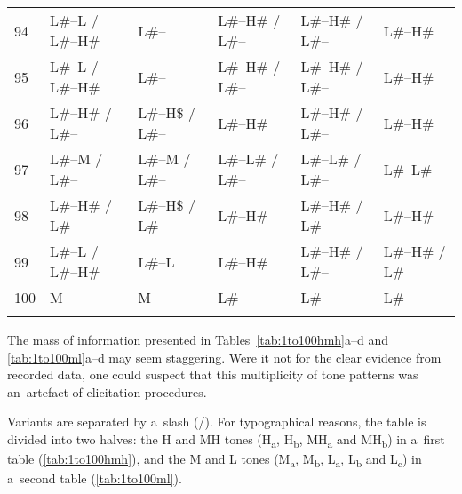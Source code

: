 {\begin{subtables}
\begin{table}[h!!]
{{\begin{tabularx}{\textwidth}{ l P{22mm} Q Q Q Q }
					94 & L\#--L / L\#--H\# & L\#-- & L\#--H\# / L\#-- & L\#--H\# / L\#-- & L\#--H\#\\
					95 & L\#--L / L\#--H\# & L\#-- & L\#--H\# / L\#-- & L\#--H\# / L\#-- & L\#--H\#\\
					96 & L\#--H\# / L\#-- & L\#--H\$ / L\#-- & L\#--H\# & L\#--H\# / L\#-- & L\#--H\#\\
					97 & L\#--M / L\#-- & L\#--M / L\#-- & L\#--L\# / L\#-- & L\#--L\# / L\#-- & L\#--L\#\\
					98 & L\#--H\# / L\#-- & L\#--H\$ / L\#-- & L\#--H\# & L\#--H\# / L\#-- & L\#--H\#\\
					99 & L\#--L / L\#--H\# & L\#--L & L\#--H\# & L\#--H\# / L\#-- & L\#--H\# / L\#\\
					100 & M & M & L\# & L\# & L\#\\
				\lspbottomrule
				\end{tabularx}}
			}
		\end{table}
	\end{subtables}
	\clearpage
}

   
The mass of information presented in Tables~\ref{tab:1to100hmh}a--d and \ref{tab:1to100ml}a--d may
seem staggering. Were it not for the clear evidence from recorded data, one could suspect that this
multiplicity of tone patterns was an~artefact of elicitation procedures.

{\largerpage}

Variants are separated by a~slash (/). For typographical reasons, the table is divided into two
halves: the H and MH tones (H\textsubscript{a}, H\textsubscript{b}, MH\textsubscript{a} and MH\textsubscript{b}) in a~first table (\ref{tab:1to100hmh}), and the M and L tones (M\textsubscript{a}, M\textsubscript{b},
L\textsubscript{a}, L\textsubscript{b} and L\textsubscript{c}) in a~second table (\ref{tab:1to100ml}).


